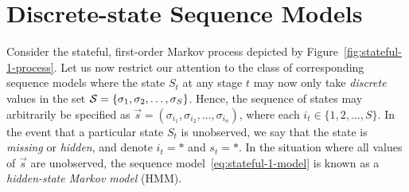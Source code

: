 \documentclass[a4paper]{article}
\begin{document}
\section{Discrete-state Sequence Models}\label{sec:discrete-state}

Consider the stateful, first-order Markov process depicted by Figure~\ref{fig:stateful-1-process}.
Let us now restrict our attention to the class of corresponding sequence models where
the state $S_t$ at any stage $t$ may now only take {\em discrete} values in the set 
${\cal S}=\{\sigma_1,\sigma_2,\ldots,\sigma_S\}$.
Hence, the sequence of states may arbitrarily be specified as $\vec{s}=(\sigma_{i_1},\sigma_{i_2},\ldots,\sigma_{i_n})$,
where each $i_t\in\{1,2,\ldots,S\}$.
In the event that a particular state $S_t$ is unobserved, we say that the state is {\em missing} or {\em hidden},
and denote $i_t=*$ and $s_t=*$. In the situation where all values of $\vec{s}$ are unobserved,
the sequence model~\eqref{eq:stateful-1-model} is known as a {\em hidden-state Markov model} (HMM).
\end{document}
